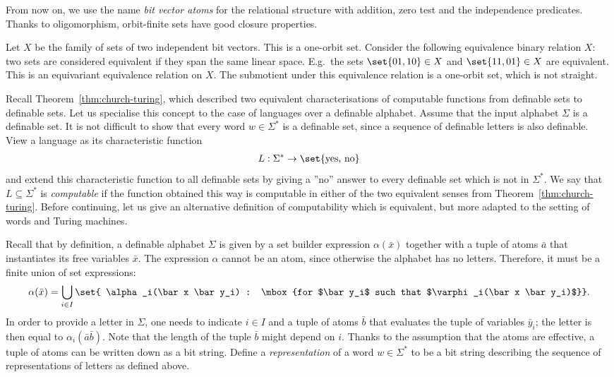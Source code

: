 From now on, we use the name \emph{bit vector atoms} for the relational structure with addition, zero test and the independence predicates. Thanks to oligomorphism, orbit-finite sets have good closure properties. 


\begin{ourexample}[Grassmannian]
	\label{ex:grassmannian}
	Let $X$ be the family of sets of two independent bit vectors. This is a one-orbit set.
	Consider the following equivalence binary relation $X$: two sets are considered equivalent if they span the same linear space. E.g.~the sets $\set{01,10} \in X$ and $\set{11,01} \in X$ are equivalent. This is an equivariant equivalence relation on $X$. The submotient under this equivalence relation is a one-orbit set, which is not straight. 
\end{ourexample}


Recall Theorem~\ref{thm:church-turing}, which described two equivalent characterisations of computable functions from definable sets to definable sets. Let us specialise this concept to the case of languages over a definable alphabet. Assume that the input alphabet $\Sigma$ is a definable set. It is not difficult to show that every word $w \in \Sigma^*$ is a definable set, since a sequence of definable letters is also definable. View a language as its characteristic function
\begin{align*}
 L : \Sigma^* \to \set{\mbox{yes, no}}
\end{align*}
and extend this characteristic function to all definable sets by giving a ''no'' answer to every definable set which is not in $\Sigma^*$. We say that $L \subseteq \Sigma^*$ is \emph{computable} if the function obtained this way is computable in either of the two equivalent senses from Theorem~\ref{thm:church-turing}. Before continuing, let us give an alternative definition of computability which is equivalent, but more adapted to the setting of words and Turing machines. 

Recall that by definition, a definable alphabet $\Sigma$ is given by a set builder expression $\alpha(\bar x)$ together with a tuple of atoms $\bar a$ that instantiates its free variables $\bar x$. The expression $\alpha$ cannot be an atom, since otherwise the alphabet has no letters. Therefore, it must be a finite union of set expressions:
\begin{align*}
 \alpha(\bar x) = \bigcup_{i \in I} \set{ \alpha_i(\bar x \bar y_i) : \mbox{for $\bar y_i$ such that $\varphi_i(\bar x \bar y_i)$}}.
\end{align*}
In order to provide a letter in $\Sigma$, one needs to indicate $i \in I$ and a tuple of atoms $\bar b$ that evaluates the tuple of variables $\bar y_i$; the letter is then equal to $\alpha_i(\bar a \bar b)$. Note that the length of the tuple $\bar b$ might depend on $i$. Thanks to the assumption that the atoms are effective, a tuple of atoms can be written down as a bit string. Define a \emph{representation} of a word $w \in \Sigma^*$ to be a bit string describing the sequence of representations of letters as defined above. 

